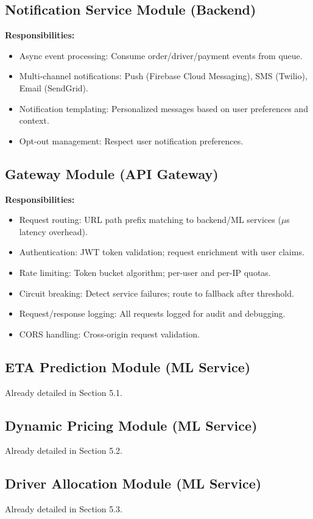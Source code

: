 \documentclass[12pt,a4paper]{report}
\begin{document}
\begin{itemize}
\subsection{Notification Service Module (Backend)}
\textbf{Responsibilities:}
\begin{itemize}
    \item Async event processing: Consume order/driver/payment events from queue.
    \item Multi-channel notifications: Push (Firebase Cloud Messaging), SMS (Twilio), Email (SendGrid).
    \item Notification templating: Personalized messages based on user preferences and context.
    \item Opt-out management: Respect user notification preferences.
\end{itemize}

\subsection{Gateway Module (API Gateway)}
\textbf{Responsibilities:}
\begin{itemize}
    \item Request routing: URL path prefix matching to backend/ML services ($\mu$s latency overhead).
    \item Authentication: JWT token validation; request enrichment with user claims.
    \item Rate limiting: Token bucket algorithm; per-user and per-IP quotas.
    \item Circuit breaking: Detect service failures; route to fallback after threshold.
    \item Request/response logging: All requests logged for audit and debugging.
    \item CORS handling: Cross-origin request validation.
\end{itemize}

\subsection{ETA Prediction Module (ML Service)}
Already detailed in Section 5.1.

\subsection{Dynamic Pricing Module (ML Service)}
Already detailed in Section 5.2.

\subsection{Driver Allocation Module (ML Service)}
Already detailed in Section 5.3.


\end{itemize}
\end{document}
